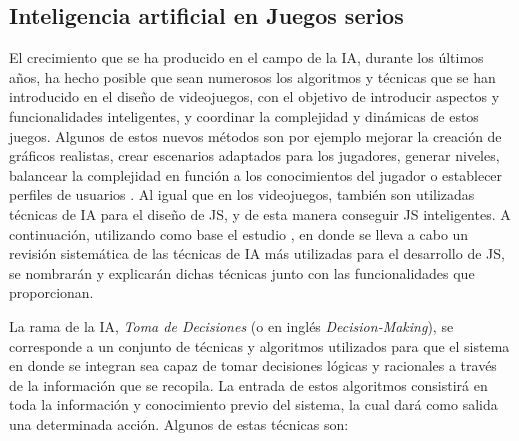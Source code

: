 \subsection{Inteligencia artificial en Juegos serios}
\label{sec:PersonalizacionJuegos}
El crecimiento que se ha producido en el campo de la IA, durante los últimos años, ha hecho posible que sean numerosos los algoritmos y técnicas que se han introducido en el diseño de videojuegos, con el objetivo de introducir aspectos y funcionalidades inteligentes, y coordinar la complejidad y dinámicas de estos juegos. Algunos de estos nuevos métodos son por ejemplo mejorar la creación de gráficos realistas, crear escenarios adaptados para los jugadores, generar niveles, balancear la complejidad en función a los conocimientos del jugador o establecer perfiles de usuarios \cite{westera2020artificial}. Al igual que en los videojuegos, también son utilizadas técnicas de IA para el diseño de JS, y de esta manera conseguir JS inteligentes. A continuación, utilizando como base el estudio \cite{frutos2015review}, en donde se lleva a cabo un revisión sistemática de las técnicas de IA más utilizadas para el desarrollo de JS, se nombrarán y explicarán dichas técnicas junto con las funcionalidades que proporcionan.

La rama de la IA, \emph{Toma de Decisiones} (o en inglés \emph{Decision-Making}), se corresponde a un conjunto de técnicas y algoritmos utilizados para que el sistema en donde se integran sea capaz de tomar decisiones lógicas y racionales a través de la información que se recopila. La entrada de estos algoritmos consistirá en toda la información y conocimiento previo del sistema, la cual dará como salida una determinada acción. Algunos de estas técnicas son:

